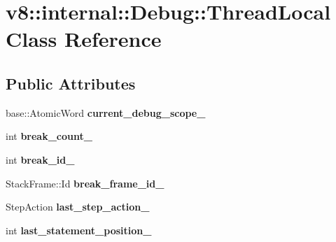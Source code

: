 \hypertarget{classv8_1_1internal_1_1_debug_1_1_thread_local}{}\section{v8\+:\+:internal\+:\+:Debug\+:\+:Thread\+Local Class Reference}
\label{classv8_1_1internal_1_1_debug_1_1_thread_local}
\subsection*{Public Attributes}
\begin{DoxyCompactItemize}
\item 
base\+::\+Atomic\+Word {\bfseries current\+\_\+debug\+\_\+scope\+\_\+}\hypertarget{classv8_1_1internal_1_1_debug_1_1_thread_local_a40cbf57da627ea2158a23933e8a55760}{}\label{classv8_1_1internal_1_1_debug_1_1_thread_local_a40cbf57da627ea2158a23933e8a55760}

\item 
int {\bfseries break\+\_\+count\+\_\+}\hypertarget{classv8_1_1internal_1_1_debug_1_1_thread_local_a009491de9963b7531e7a192ee67b57e9}{}\label{classv8_1_1internal_1_1_debug_1_1_thread_local_a009491de9963b7531e7a192ee67b57e9}

\item 
int {\bfseries break\+\_\+id\+\_\+}\hypertarget{classv8_1_1internal_1_1_debug_1_1_thread_local_a8e6bb390fb8585e52676d3272ccc298d}{}\label{classv8_1_1internal_1_1_debug_1_1_thread_local_a8e6bb390fb8585e52676d3272ccc298d}

\item 
Stack\+Frame\+::\+Id {\bfseries break\+\_\+frame\+\_\+id\+\_\+}\hypertarget{classv8_1_1internal_1_1_debug_1_1_thread_local_ac10854a9175c664709a337741ef254de}{}\label{classv8_1_1internal_1_1_debug_1_1_thread_local_ac10854a9175c664709a337741ef254de}

\item 
Step\+Action {\bfseries last\+\_\+step\+\_\+action\+\_\+}\hypertarget{classv8_1_1internal_1_1_debug_1_1_thread_local_a27ff906310e1c1eb8f374f15d939301d}{}\label{classv8_1_1internal_1_1_debug_1_1_thread_local_a27ff906310e1c1eb8f374f15d939301d}

\item 
int {\bfseries last\+\_\+statement\+\_\+position\+\_\+}\hypertarget{classv8_1_1internal_1_1_debug_1_1_thread_local_aa5fde337fe57bd052324b4d8433e8e9b}{}\label{classv8_1_1internal_1_1_debug_1_1_thread_local_aa5fde337fe57bd052324b4d8433e8e9b}


\end{DoxyCompactItemize}

